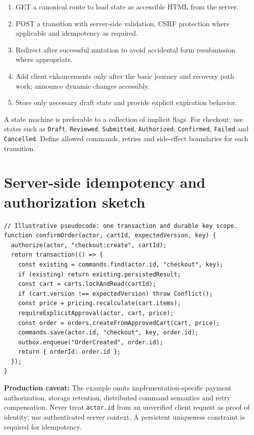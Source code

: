 \documentclass[11pt]{article}
\begin{document}
\begin{enumerate}
\item GET a canonical route to load state as accessible HTML from the server.
\item POST a transition with server-side validation, CSRF protection where applicable and idempotency as required.
\item Redirect after successful mutation to avoid accidental form resubmission where appropriate.
\item Add client enhancements only after the basic journey and recovery path work; announce dynamic changes accessibly.
\item Store only necessary draft state and provide explicit expiration behavior.
\end{enumerate}
\begin{modernbox}A state machine is preferable to a collection of implicit flags. For checkout, use states such as \texttt{Draft}, \texttt{Reviewed}, \texttt{Submitted}, \texttt{Authorized}, \texttt{Confirmed}, \texttt{Failed} and \texttt{Cancelled}. Define allowed commands, retries and side-effect boundaries for each transition.\end{modernbox}

\section{Server-side idempotency and authorization sketch}

\begin{lstlisting}[language={}]
// Illustrative pseudocode: one transaction and durable key scope.
function confirmOrder(actor, cartId, expectedVersion, key) {
  authorize(actor, "checkout:create", cartId);
  return transaction(() => {
    const existing = commands.find(actor.id, "checkout", key);
    if (existing) return existing.persistedResult;
    const cart = carts.lockAndRead(cartId);
    if (cart.version !== expectedVersion) throw Conflict();
    const price = pricing.recalculate(cart.items);
    requireExplicitApproval(actor, cart, price);
    const order = orders.createFromApprovedCart(cart, price);
    commands.save(actor.id, "checkout", key, order.id);
    outbox.enqueue("OrderCreated", order.id);
    return { orderId: order.id };
  });
}
\end{lstlisting}
\textbf{Production caveat:} The example omits implementation-specific payment authorization, storage retention, distributed command semantics and retry compensation. Never treat \texttt{actor.id} from an unverified client request as proof of identity; use authenticated server context. A persistent uniqueness constraint is required for idempotency.
\end{document}
